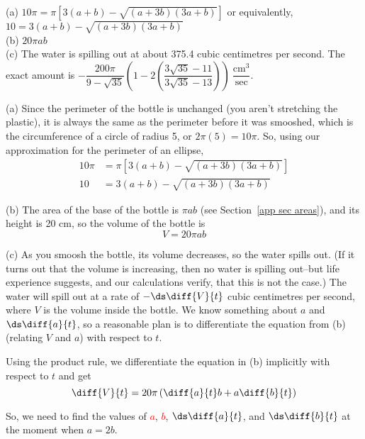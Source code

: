 \begin{answer}
(a)  $10\pi=\pi\left[3(a+b)-\sqrt{(a+3b)(3a+b)}\right]$ or equivalently,
$10=3(a+b)-\sqrt{(a+3b)(3a+b)}
$\\
(b) $20\pi a b$\\
(c) The water is spilling out at about 375.4 cubic centimetres per second. The exact amount is
$-\dfrac{200\pi}{9-\sqrt{35}}\left(1-2\left(\dfrac{3\sqrt{35}-11}{3\sqrt{35}-13}\right)\right)~\dfrac{\mathrm{cm}^3}{\mathrm{sec}}$.
\end{answer}
\begin{solution}
(a) Since the perimeter of the bottle is unchanged (you aren't stretching the plastic), it is always the same as the perimeter before it was smooshed, which is the circumference of a circle of radius 5, or $2\pi(5)=10\pi$. So, using our approximation for the perimeter of an ellipse,
\begin{align*}
10\pi&=\pi\left[3(a+b)-\sqrt{(a+3b)(3a+b)}\right]\\
10&=3(a+b)-\sqrt{(a+3b)(3a+b)}
\end{align*}

(b) The area of the base of the bottle is $\pi a b$
(see Section~\ref*{app sec areas}), and its height is 20 cm, so the volume of the bottle is
\[V=20\pi a b\]

(c) As you smoosh the bottle, its volume decreases, so the water spills out. (If it turns out that the volume is increasing, then no water is spilling out--but life experience suggests, and our calculations verify, that this is not the case.)
The water will spill out at a rate of $-\ds\diff{V}{t}$ cubic centimetres per second, where $V$ is the volume inside the bottle. We know something about $a$ and $\ds\diff{a}{t}$, so a reasonable plan is to differentiate the equation from (b) (relating $V$ and $a$) with respect to $t$.

Using the product rule, we differentiate the equation in (b) implicitly with respect to $t$ and get
\[\diff{V}{t}=20\pi\left(\diff{a}{t}b+a\diff{b}{t}\right)\]

So, we need to find the values of \textcolor{red}{$a$}, \textcolor{red}{$b$},
\textcolor{red}{$\ds\diff{a}{t}$}, and \textcolor{red}{$\ds\diff{b}{t}$} at the moment when $a=2b$.


\end{solution}
